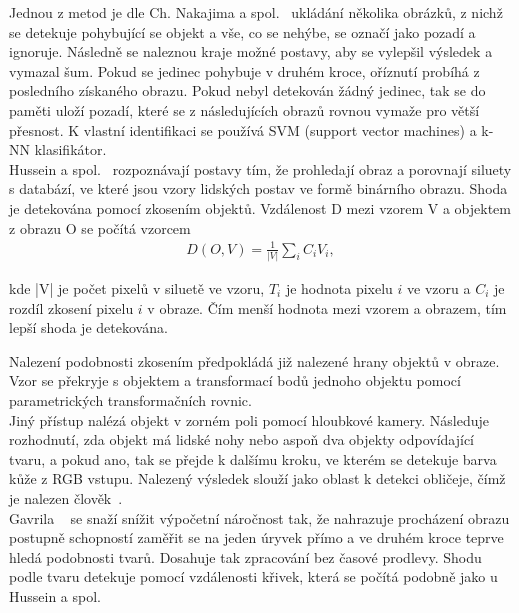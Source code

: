 Jednou z metod je dle Ch. Nakajima a spol.~\cite{6} ukládání několika obrázků, z nichž se detekuje pohybující se objekt a vše, co se nehýbe, se označí jako pozadí a ignoruje. Následně se naleznou kraje možné postavy, aby se vylepšil výsledek a vymazal šum. Pokud se jedinec pohybuje v druhém kroce, oříznutí probíhá z posledního získaného obrazu. Pokud nebyl detekován žádný jedinec, tak se do paměti uloží pozadí, které se z následujících obrazů rovnou vymaže pro větší přesnost. K vlastní identifikaci se používá SVM (support vector machines) a k-NN klasifikátor.\\

Hussein a spol.~\cite{9} rozpoznávají postavy tím, že prohledají obraz a porovnají siluety s databází, ve které jsou vzory lidských postav ve formě binárního obrazu. Shoda je detekována pomocí zkosením objektů. Vzdálenost D mezi vzorem V a objektem z obrazu O se počítá vzorcem
\begin{eqnarray}
 D(O,V) = \frac{1}{|V|}\sum_{i}^{}C_{i}V_{i}   ,
\end{eqnarray}

kde |V| je počet pixelů v siluetě ve vzoru, $ T_{i} $ je hodnota pixelu $ i $ ve vzoru a $ C_{i} $ je rozdíl zkosení pixelu $ i $ v obraze. Čím menší hodnota mezi vzorem a obrazem, tím lepší shoda je detekována.

Nalezení podobnosti zkosením předpokládá již nalezené hrany objektů v obraze. Vzor se překryje s objektem a transformací bodů jednoho objektu pomocí parametrických transformačních rovnic.\\

Jiný přístup nalézá objekt v zorném poli pomocí hloubkové kamery. Následuje rozhodnutí, zda objekt má lidské nohy nebo aspoň dva objekty odpovídající tvaru, a pokud ano, tak se přejde k dalšímu kroku, ve kterém se detekuje barva kůže z RGB vstupu. Nalezený výsledek slouží jako oblast k detekci obličeje, čímž je nalezen člověk~\cite{10}.\\

Gavrila ~\cite{7} se snaží snížit výpočetní náročnost tak, že nahrazuje procházení obrazu postupně schopností zaměřit se na jeden úryvek přímo a ve druhém kroce teprve hledá podobnosti tvarů. Dosahuje tak zpracování bez časové prodlevy.
Shodu podle tvaru detekuje pomocí vzdálenosti křivek, která se počítá podobně jako u Hussein a spol.~\cite{9} 

